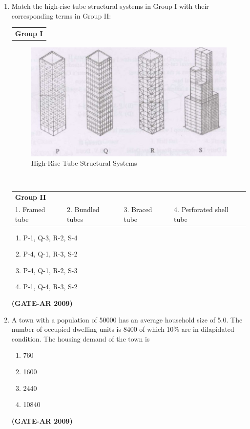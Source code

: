 \documentclass[a4paper,10pt]{article}
\begin{document}
\begin{enumerate}
    \item Match the high-rise tube structural systems in Group I with their corresponding terms in Group II:  \\
    \begin{tabular}{ l }
	\textbf{Group I} \\
	\end{tabular}
	\begin{figure}[h!]
        \centering
        \includegraphics[width=0.5\linewidth]{figs/img_02.jpg}
	\caption{High-Rise Tube Structural Systems}
	\end{figure} \\
    \begin{tabular}{ l l l l }
	\textbf{Group II} & & & \\
	1. Framed tube & 2. Bundled tubes & 3. Braced tube & 4. Perforated shell tube \\
	\end{tabular}
	\begin{multicols}{2}
	\begin{enumerate}
        \item P-1, Q-3, R-2, S-4
        \item P-4, Q-1, R-3, S-2
        \item P-4, Q-1, R-2, S-3
        \item P-1, Q-4, R-3, S-2
    \end{enumerate}
	\end{multicols}
    \hfill \textbf{(GATE-AR 2009)}

    \item A town with a population of 50000 has an average household size of 5.0. The number of occupied dwelling units is 8400 of which 10\% are in dilapidated condition. The housing demand of the town is 
    \begin{multicols}{4}
	\begin{enumerate}
        \item 760
        \item 1600
        \item 2440
        \item 10840
    \end{enumerate}
	\end{multicols}
    \hfill \textbf{(GATE-AR 2009)}


\end{enumerate}
\end{document}
